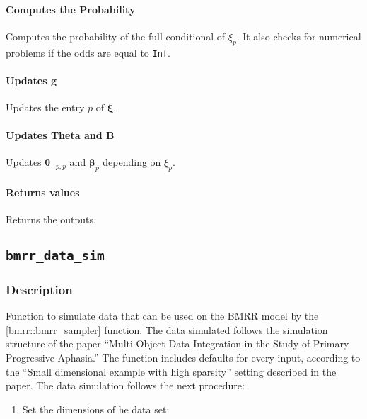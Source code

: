 \documentclass[
]{article}
\providecommand{\tightlist}{%
  \setlength{\itemsep}{0pt}\setlength{\parskip}{0pt}}
\begin{document}
\paragraph{Computes the Probability}\label{computes-the-probability}

Computes the probability of the full conditional of \(\xi_p\). It also checks for
numerical problems if the odds are equal to \texttt{Inf}.

\paragraph{Updates g}\label{updates-g}

Updates the entry \(p\) of \( {\boldsymbol \xi} \).

\paragraph{Updates Theta and B}\label{updates-theta-and-b}

Updates \( {\boldsymbol \theta} _{-p,p}\) and \( {\boldsymbol \beta} _p\) depending on \(\xi_p\).

\paragraph{Returns values}\label{returns-values-1}

Returns the outputs.

\subsection{\texorpdfstring{\texttt{bmrr\_data\_sim}}{bmrr\_data\_sim}}\label{bmrr_data_sim}

\subsubsection{Description}\label{data_sim_description}

Function to simulate data that can be used on the BMRR model by
the {[}bmrr::bmrr\_sampler{]} function. The data simulated follows the simulation
structure of the paper ``Multi-Object Data Integration in the Study of
Primary Progressive Aphasia.'' The function includes defaults for every input,
according to the ``Small dimensional example with high sparsity'' setting
described in the paper. The data simulation follows the next procedure:

\begin{enumerate}
\def\labelenumi{\arabic{enumi}.}
\tightlist
\item
  Set the dimensions of he data set:
\end{enumerate}
\end{document}
